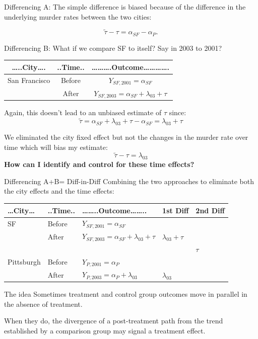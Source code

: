 \documentclass[
  ignorenonframetext,
]{beamer}
\begin{document}
\begin{frame}{Differencing A:}
\protect\hypertarget{differencing-a-1}{}
The simple difference is biased because of the difference in the
underlying murder rates between the two cities:

\[
\tilde{\tau}-\tau=\alpha_{SF}-\alpha_{P}. 
\]
\end{frame}

\begin{frame}{Differencing B:}
\protect\hypertarget{differencing-b}{}
What if we compare SF to itself? Say in 2003 to 2001?

\begin{longtable}[]{@{}ccc@{}}
\toprule
\ldots..City\ldots. & ..Time.. &
\ldots\ldots\ldots.Outcome\ldots\ldots\ldots\ldots.\tabularnewline
\midrule
\endhead
San Francisco & Before & \(Y_{SF,2001}=\alpha_{SF}\)\tabularnewline
& After & \(Y_{SF,2003}=\alpha_{SF}+\lambda_{03}+\tau\)\tabularnewline
\bottomrule
\end{longtable}

Again, this doesn't lead to an unbiased estimate of \(\tau\) since: \[
\tilde{\tau}=\alpha_{SF}+\lambda_{03}+\tau-\alpha_{SF}=\lambda_{03}+\tau
\]

We eliminated the city fixed effect but not the changes in the murder
rate over time which will bias my estimate: \[
\tilde{\tau}-\tau=\lambda_{03}
\] \textbf{How can I identify and control for these time effects?}
\end{frame}

\begin{frame}{Differencing A+B= Diff-in-Diff}
\protect\hypertarget{differencing-ab-diff-in-diff}{}
Combining the two approaches to eliminate both the city effects and the
time effects:

\begin{longtable}[]{@{}lllll@{}}
\toprule
\ldots City\ldots{} & ..Time.. & \ldots\ldots..Outcome\ldots\ldots.. &
1st Diff & 2nd Diff\tabularnewline
\midrule
\endhead
SF & Before & \(Y_{SF,2001}=\alpha_{SF}\) & &\tabularnewline
& After & \(Y_{SF,2003}=\alpha_{SF}+\lambda_{03}+\tau\) &
\(\lambda_{03}+\tau\) &\tabularnewline
& & & & \(\tau\)\tabularnewline
Pittsburgh & Before & \(Y_{P,2001}=\alpha_{P}\) & &\tabularnewline
& After & \(Y_{P,2003}=\alpha_{P}+\lambda_{03}\) & \(\lambda_{03}\)
&\tabularnewline
\bottomrule
\end{longtable}
\end{frame}

\begin{frame}{The idea}
\protect\hypertarget{the-idea}{}
Sometimes treatment and control group outcomes move in parallel in the
absence of treatment.

When they do, the divergence of a post-treatment path from the trend
established by a comparison group may signal a treatment effect.
\end{frame}
\end{document}

